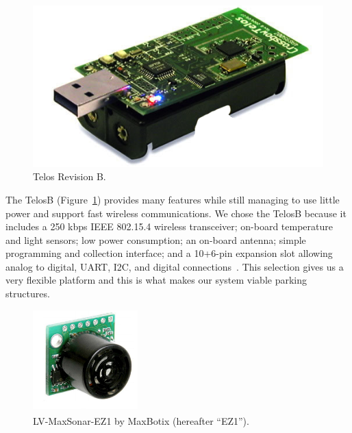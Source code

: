 \documentclass{acm_proc}
\begin{document}
\begin{figure}
    \begin{center}
		\includegraphics[width=\columnwidth]{figures/telosb}
	\end{center}
	\caption{Telos Revision B.}
	\label{fig:telosb}
\end{figure}

The TelosB (Figure~\ref{fig:telosb}) provides many features while still
managing to use little power and support fast wireless communications.
We chose the TelosB because it includes a 250 kbps IEEE 802.15.4 wireless
transceiver; on-board temperature and light sensors; low power consumption;
an on-board antenna; simple programming and collection interface; and a
10+6-pin expansion slot allowing analog to digital, UART, I2C, and digital
connections~\cite{moteiv:telosb}.
This selection gives us a very flexible platform and this is what makes our
system viable parking structures.

\begin{figure}
    \begin{center}
		\includegraphics[height=1.5in]{figures/range_finder}
	\end{center}
	\caption{LV-MaxSonar\textsuperscript{\textregistered}-EZ1\textsuperscript{\texttrademark}
	by MaxBotix\textsuperscript{\textregistered} (hereafter ``EZ1'').}
	\label{fig:range_finder}
\end{figure}
\end{document}
